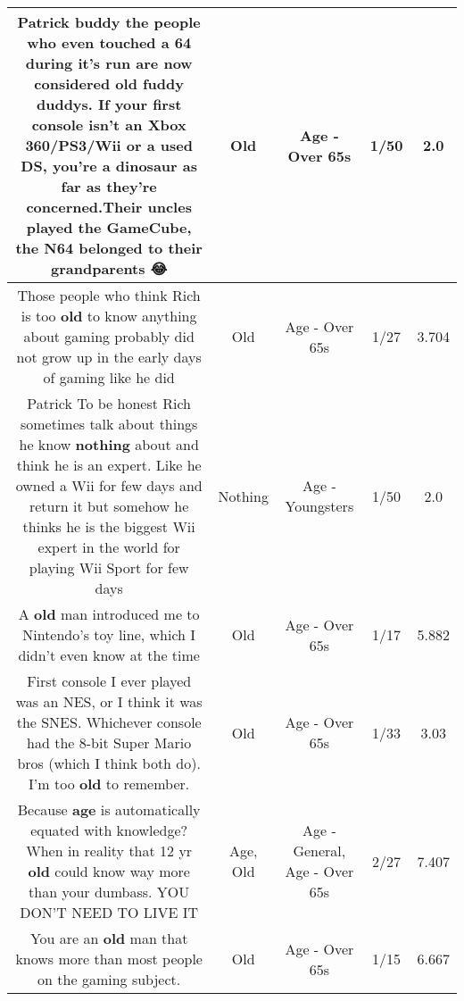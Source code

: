 \documentclass[11pt]{article}
\newlength\mylength
\begin{document}
\begin{center}
\begin{longtable}{|C{.65\mylength}|C{.30\mylength}|C{.12\mylength}|C{.12\mylength}|C{.12\mylength}|}
  \small Patrick buddy the people who even touched a 64 during it's run are now considered \textbf{old} fuddy duddys. If your first console isn't an Xbox 360/PS3/Wii or a used DS, you're a dinosaur as far as they're concerned.Their uncles played the GameCube, the N64 belonged to their grandparents 😂\normalsize   & Old & Age - Over 65s & 1/50 & 2.0 \\  \hline
  \small Those people who think Rich is too \textbf{old} to know anything about gaming probably did not grow up in the early days of gaming like he did\normalsize   & Old & Age - Over 65s & 1/27 & 3.704 \\  \hline
  \small Patrick To be honest Rich sometimes talk about things he know \textbf{nothing} about and think he is an expert. Like he owned a Wii for few days and return it but somehow he thinks he is the biggest Wii expert in the world for playing Wii Sport for few days\normalsize   & Nothing & Age - Youngsters & 1/50 & 2.0 \\  \hline
  \small A \textbf{old} man introduced me to Nintendo's toy line, which I didn't even know at the time\normalsize   & Old & Age - Over 65s & 1/17 & 5.882 \\  \hline
  \small First console I ever played was an NES, or I think it was the SNES. Whichever console had the 8-bit Super Mario bros (which I think both do). I'm too \textbf{old} to remember.\normalsize   & Old & Age - Over 65s & 1/33 & 3.03 \\  \hline
  \small Because \textbf{age} is automatically equated with knowledge?When in reality that 12 yr \textbf{old} could know way more than your dumbass.  YOU DON'T NEED TO LIVE IT\normalsize   & Age, Old & Age - General, Age - Over 65s & 2/27 & 7.407 \\  \hline
  \small You are an \textbf{old} man that knows more than most people on the gaming subject.\normalsize   & Old & Age - Over 65s & 1/15 & 6.667 \\  \hline

\end{longtable}
\end{center}
\end{document}
